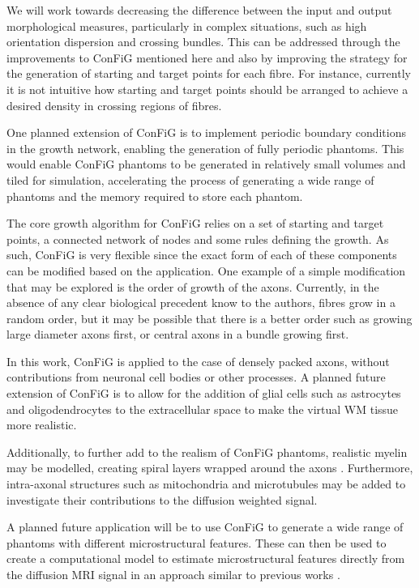 We will work towards decreasing the difference between the input and output morphological measures, particularly in complex situations, such as high orientation dispersion and crossing bundles. This can be addressed through the improvements to ConFiG mentioned here and also by improving the strategy for the generation of starting and target points for each fibre. For instance, currently it is not intuitive how starting and target points should be arranged to achieve a desired density in crossing regions of fibres.

One planned extension of ConFiG is to implement periodic boundary conditions in the growth network, enabling the generation of fully periodic phantoms. This would enable ConFiG phantoms to be generated in relatively small volumes and tiled for simulation, accelerating the process of generating a wide range of phantoms and the memory required to store each phantom.

The core growth algorithm for ConFiG relies on a set of starting and target points, a connected network of nodes and some rules defining the growth. As such, ConFiG is very flexible since the exact form of each of these components can be modified based on the application. One example of a simple modification that may be explored is the order of growth of the axons. Currently, in the absence of any clear biological precedent know to the authors, fibres grow in a random order, but it may be possible that there is a better order such as growing large diameter axons first, or central axons in a bundle growing first.

In this work, ConFiG is applied to the case of densely packed axons, without contributions from neuronal cell bodies or other processes. A planned future extension of ConFiG is to allow for the addition of glial cells such as astrocytes and oligodendrocytes \cite{Palombo2019} to the extracellular space to make the virtual WM tissue more realistic.

Additionally, to further add to the realism of ConFiG phantoms, realistic myelin may be modelled, creating spiral layers wrapped around the axons \cite{Brusini2019}. Furthermore, intra-axonal structures such as mitochondria and microtubules may be added to investigate their contributions to the diffusion weighted signal.

A planned future application will be to use ConFiG to generate a wide range of phantoms with different microstructural features. These can then be used to create a computational model to estimate microstructural features directly from the diffusion MRI signal in an approach similar to previous works \cite{Hill2019,Palombo2018a,Palombo2016,Nedjati-Gilani2017,Rensonnet2018}.

